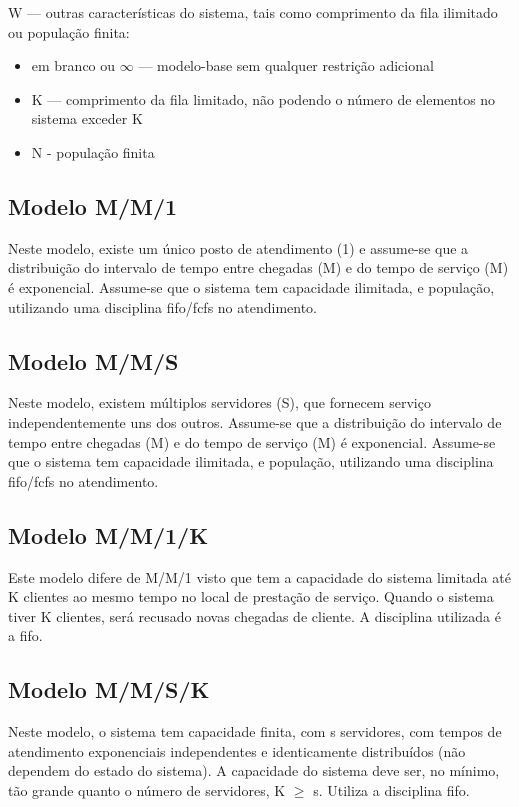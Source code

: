 W — outras características do sistema, tais como comprimento da fila ilimitado ou população finita:
\begin{itemize}
\item em branco ou $\infty$ — modelo-base sem qualquer restrição adicional
\item K — comprimento da fila limitado, não podendo o número de elementos no
sistema exceder K
\item N - população finita
\end{itemize}


\subsection{Modelo M/M/1}

Neste modelo, existe um único posto de atendimento (1) e assume-se que a distribuição do intervalo de tempo entre chegadas (M) e do tempo de serviço (M) é exponencial. Assume-se que o sistema tem capacidade ilimitada, e população, utilizando uma disciplina \acrshort{fifo}/\acrshort{fcfs} no atendimento.

\subsection{Modelo M/M/S}
Neste modelo, existem múltiplos servidores (S), que fornecem serviço independentemente uns dos outros. Assume-se que a distribuição do intervalo de tempo entre chegadas (M) e do tempo de serviço (M) é exponencial. Assume-se que o sistema tem capacidade ilimitada, e população, utilizando uma disciplina \acrshort{fifo}/\acrshort{fcfs} no atendimento.

\subsection{Modelo M/M/1/K}
Este modelo difere de M/M/1 visto que tem a capacidade do sistema limitada até K clientes ao mesmo tempo no local de prestação de serviço. Quando o sistema tiver K clientes, será recusado novas chegadas de cliente. A disciplina utilizada é a \acrshort{fifo}.

\subsection{Modelo M/M/S/K}
Neste modelo, o sistema tem capacidade finita, com s servidores, com tempos de atendimento exponenciais independentes e identicamente distribuídos (não dependem do estado do sistema). A capacidade do sistema deve ser, no mínimo, tão grande quanto o número de servidores, K $\geqslant$ s. Utiliza a disciplina \acrshort{fifo}.

